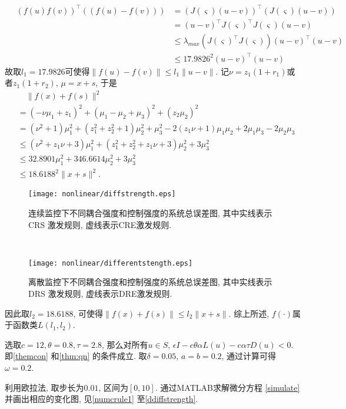         \begin{align*}
        \quad(f(u)f(v))^\top((f(u)-f(v)))
        &=(J(\varsigma)(u-v))^\top(J(\varsigma)(u-v))\\
        &=(u-v)^\top J(\varsigma)^\top J(\varsigma)(u-v)\\
        &\leq\lambda_{max}(J(\varsigma)^\top J(\varsigma))(u-v)^\top(u-v)\\
        &\leq17.9826^2(u-v)^\top(u-v)
        \end{align*}
        故取$l_1=17.9826$可使得$\parallel f(u)-f(v)\parallel\leq l_1\parallel u-v\parallel$. 记$\nu=z_1(1+r_1)$或者$z_1(1+r_2)$, $\mu=x+s$, 于是
        \begin{align*}
         &\quad\| f(x)+f(s)\|^2\\
         &=(-\nu\mu_1+z_1)^2+(\mu_1-\mu_2+\mu_3)^2+(z_2\mu_2)^2\\
         &=(\nu^2+1)\mu_1^2+(z_1^2+z_2^2+1)\mu_2^2+\mu_3^2-2(z_1\nu+1)\mu_1\mu_2+2\mu_1\mu_3-2\mu_2\mu_3\\
         &\leq(\nu^2+z_1\nu+3)\mu_1^2+(z_1^2+z_2^2+z_1\nu+3)\mu_2^2+3\mu_3^2\\
         &\leq32.8901\mu_1^2+346.6614\mu_2^2+3\mu_3^2\\
         &\leq18.6188^2\| x+s\|^2.
        \end{align*}
\begin{figure}[!htb]
\begin{minipage}[t]{0.48\linewidth}
\centering
\texttt{[image: nonlinear/diffstrength.eps]}
\caption{连续监控下不同耦合强度和控制强度的系统总误差图, 其中实线表示CRS 激发规则, 虚线表示CRE激发规则.}\label{cdiffstrength}
\end{minipage}~~
\begin{minipage}[t]{0.48\linewidth}
\centering
\texttt{[image: nonlinear/differentstength.eps]}
\caption{离散监控下不同耦合强度和控制强度的系统总误差图, 其中实线表示DRS 激发规则, 虚线表示DRE激发规则.}\label{ddiffstrength}
\end{minipage}
\end{figure}
       因此取$l_2=18.6188$, 可使得$\| f(x)+f(s)\|\leq l_2\| x+s\|$. 综上所述, $f(\cdot)$属于函数类$L(l_1,l_2)$.

        选取$c=12, \theta=0.8, \tau=2.8$, 那么对所有$u\in S$, $\epsilon I-c\theta\alpha L(u)-c\alpha\tau D(u)<0$. 即\autoref{themcon} 和\autoref{thm:qn} 的条件成立. 取$\delta=0.05$, $a=b=0.2$, 通过计算可得$\omega=0.2$.

        利用欧拉法, 取步长为$0.01$, 区间为$[0,10]$. 通过MATLAB求解微分方程 \eqref{simulate} 并画出相应的变化图, 见\autoref{numcrule1} 至\autoref{ddiffstrength}.

